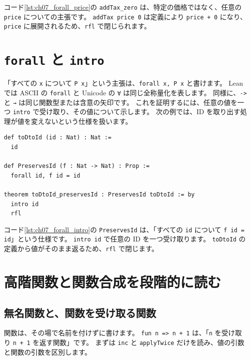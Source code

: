 コード\ref{lst:ch07_forall_price}の \texttt{addTax\_zero} は、特定の価格ではなく、任意の \texttt{price} についての主張です。
\texttt{addTax price 0} は定義により \texttt{price + 0} になり、\texttt{price} に展開されるため、\texttt{rfl} で閉じられます。

\section{\texttt{forall} と \texttt{intro}}

「すべての \texttt{x} について \texttt{P x}」という主張は、\texttt{forall x, P x} と書けます。
Lean では ASCII の \texttt{forall} と Unicode の \texttt{∀} は同じ全称量化を表します。
同様に、\texttt{->} と \texttt{→} は同じ関数型または含意の矢印です。
これを証明するには、任意の値を一つ \texttt{intro} で受け取り、その値について示します。
次の例では、ID を取り出す処理が値を変えないという仕様を扱います。

\begin{listing}[htbp]
\begin{verbatim}
def toDtoId (id : Nat) : Nat :=
  id

def PreservesId (f : Nat -> Nat) : Prop :=
  forall id, f id = id

theorem toDtoId_preservesId : PreservesId toDtoId := by
  intro id
  rfl
\end{verbatim}
\caption{\texttt{PreservesId}}
\label{lst:ch07_forall_intro}
\end{listing}

コード\ref{lst:ch07_forall_intro}の \texttt{PreservesId} は、「すべての \texttt{id} について \texttt{f id = id}」という仕様です。
\texttt{intro id} で任意の ID を一つ受け取ります。
\texttt{toDtoId} の定義から値がそのまま返るため、\texttt{rfl} で閉じます。

\section{高階関数と関数合成を段階的に読む}

\subsection{無名関数と、関数を受け取る関数}

関数は、その場で名前を付けずに書けます。
\texttt{fun n => n + 1} は、「\texttt{n} を受け取り \texttt{n + 1} を返す関数」です。
まずは \texttt{inc} と \texttt{applyTwice} だけを読み、値の引数と関数の引数を区別します。

